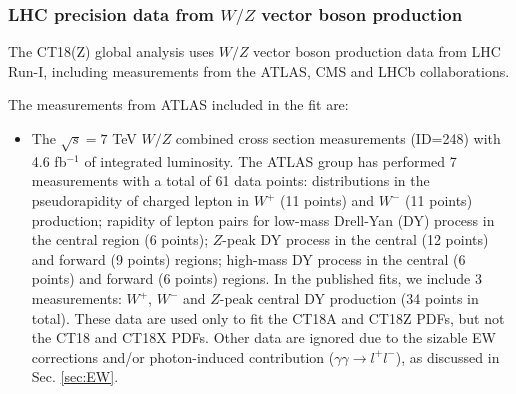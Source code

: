 \subsubsection{LHC precision data from $W/Z$ vector boson production
\label{sec:DataWZ}
}


The CT18(Z) global analysis uses $W/Z$ vector boson production data from LHC Run-I, including measurements from the ATLAS, CMS and LHCb collaborations. 

The measurements from ATLAS included in the fit are: 

\begin{itemize}
	
	\item The $\sqrt{s}=7$ TeV $W/Z$ combined cross section measurements \cite{Aaboud:2016btc} (ID=248) with 4.6 fb$^{-1}$ 
	of integrated luminosity. The ATLAS group has performed 7 measurements with a total of 61 data points: distributions in the pseudorapidity of charged lepton in $W^+$ (11 points) and $W^-$ (11 points) production; rapidity of lepton pairs for low-mass Drell-Yan (DY) process in the central region (6 points); $Z$-peak DY process in the central (12 points) and forward (9 points) regions; high-mass DY process in the central (6 points) and forward (6 points) regions. In the published fits, we include 3 measurements: $W^+$, $W^-$ and $Z$-peak central DY production (34 points in total).
	These data are used only to fit the CT18A and CT18Z PDFs, but not the CT18 and CT18X PDFs.
	Other data are ignored due to the sizable EW corrections and/or photon-induced contribution ($\gamma\gamma\to l^+l^-$), as discussed in Sec. \ref{sec:EW}.
	

\end{itemize}
